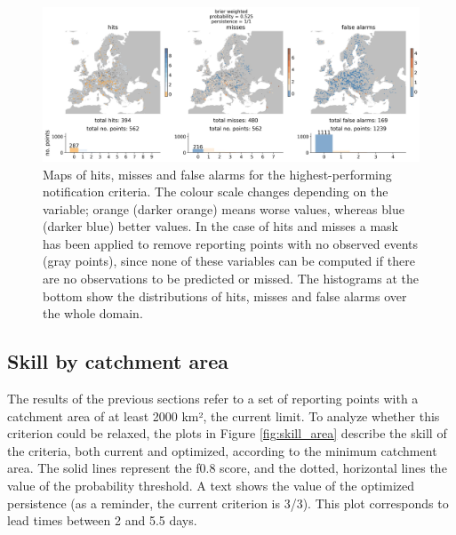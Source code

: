 \documentclass[preprint,12pt]{elsarticle}
\begin{document}
\begin{figure}
    \centering
    \includegraphics[width=1\textwidth]{figures/hits_maps_reporting_points_2000km2_1239points_brier_weighted_060h.jpg}
    \caption{Maps of hits, misses and false alarms for the highest-performing notification criteria. The colour scale changes depending on the variable; orange (darker orange) means worse values, whereas blue (darker blue) better values. In the case of hits and misses a mask has been applied to remove reporting points with no observed events (gray points), since none of these variables can be computed if there are no observations to be predicted or missed. The histograms at the bottom show the distributions of hits, misses and false alarms over the whole domain.}
    \label{fig:maps_BW}
\end{figure}

\subsection{Skill by catchment area}
\label{sec:skill_area}

The results of the previous sections refer to a set of reporting points with a catchment area of at least 2000 km², the current limit. To analyze whether this criterion could be relaxed, the plots in Figure \ref{fig:skill_area} describe the skill of the criteria, both current and optimized, according to the minimum catchment area. The solid lines represent the f0.8 score, and the dotted, horizontal lines the value of the probability threshold. A text shows the value of the optimized persistence (as a reminder, the current criterion is 3/3). This plot corresponds to lead times between 2 and 5.5 days.
\end{document}
